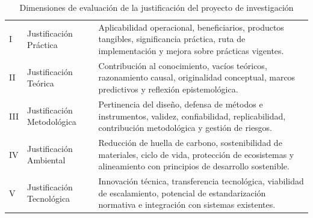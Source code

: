\begin{table}[htbp]
\centering
\scriptsize
\caption{Dimensiones de evaluación de la justificación del proyecto de investigación}
\label{tab:dimensiones-justificacion}
\begin{tabularx}{\textwidth}{|C{0.8cm}|L{4.2cm}|X|}
\hline
{}
 &  &  \\ \hline
I & Justificación Práctica & Aplicabilidad operacional, beneficiarios, productos tangibles, significancia práctica, ruta de implementación y mejora sobre prácticas vigentes.
\\ \hline
{}
II & Justificación Teórica & Contribución al conocimiento, vacíos teóricos, razonamiento causal, originalidad conceptual, marcos predictivos y reflexión epistemológica.
\\ \hline
III & Justificación Metodológica & Pertinencia del diseño, defensa de métodos e instrumentos, validez, confiabilidad, replicabilidad, contribución metodológica y gestión de riesgos.
\\ \hline
{}
IV & Justificación Ambiental & Reducción de huella de carbono, sostenibilidad de materiales, ciclo de vida, protección de ecosistemas y alineamiento con principios de desarrollo sostenible.
\\ \hline
V & Justificación Tecnológica & Innovación técnica, transferencia tecnológica, viabilidad de escalamiento, potencial de estandarización normativa e integración con sistemas existentes.
\\ \hline
\end{tabularx}
\end{table}

